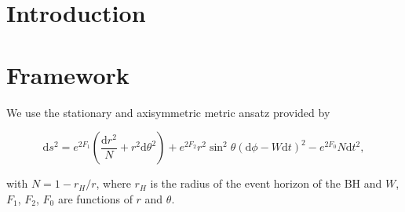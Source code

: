 \documentclass[aps, prl, amsmath, floats,floatfix, twocolumn, superscriptaddress, nofootinbib, 
showpacs]{revtex4}
\begin{document}

\section{Introduction}

\section{}

\section{Framework}




We use the stationary and axisymmetric metric ansatz provided by\citet{Herdeiro:2014a}

\begin{equation}
\mathrm{d}s^2 = e^{2F_1}\left(\frac{\mathrm{d}r^2}{N} + r^2\mathrm{d}\theta^2\right) + e^{2F_2}r^2\sin^2 \theta(\mathrm{d}\phi-W\mathrm{d}t)^2-e^{2F_0}N\mathrm{d}t^2,
\end{equation}

with $N = 1 - r_H/r$, where $r_H$ is the radius of the event horizon of the BH and $W$, $F_1$, $F_2$, $F_0$ are functions of $r$ and $\theta$.
\end{document}
